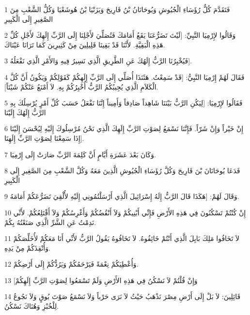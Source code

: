 \par 1 فَتَقَدَّمَ كُلُّ رُؤَسَاءِ الْجُيُوشِ وَيُوحَانَانُ بْنُ قَارِيحَ وَيَزَنْيَا بْنُ هُوشَعْيَا وَكُلُّ الشَّعْبِ مِنَ الصَّغِيرِ إِلَى الْكَبِيرِ
\par 2 وَقَالُوا لإِرْمِيَا النَّبِيِّ: [لَيْتَ تَضَرُّعَنَا يَقَعُ أَمَامَكَ فَتُصَلِّيَ لأَجْلِنَا إِلَى الرَّبِّ إِلَهِكَ لأَجْلِ كُلِّ هَذِهِ الْبَقِيَّةِ. لأَنَّنَا قَدْ بَقِينَا قَلِيلِينَ مِنْ كَثِيرِينَ كَمَا تَرَانَا عَيْنَاكَ.
\par 3 فَيُخْبِرُنَا الرَّبُّ إِلَهُكَ عَنِ الطَّرِيقِ الَّذِي نَسِيرُ فِيهِ وَالأَمْرِ الَّذِي نَفْعَلُهُ].
\par 4 فَقَالَ لَهُمْ إِرْمِيَا النَّبِيُّ: [قَدْ سَمِعْتُ. هَئَنَذَا أُصَلِّي إِلَى الرَّبِّ إِلَهِكُمْ كَقَوْلِكُمْ وَيَكُونُ أَنَّ كُلَّ الْكَلاَمِ الَّذِي يُجِيبُكُمُ الرَّبُّ أُخْبِرُكُمْ بِهِ. لاَ أَمْنَعُ عَنْكُمْ شَيْئاً].
\par 5 فَقَالُوا لإِرْمِيَا: [لِيَكُنِ الرَّبُّ بَيْنَنَا شَاهِداً صَادِقاً وَأَمِيناً إِنَّنَا نَفْعَلُ حَسَبَ كُلِّ أَمْرٍ يُرْسِلُكَ بِهِ الرَّبُّ إِلَهُكَ إِلَيْنَا
\par 6 إِنْ خَيْراً وَإِنْ شَرّاً. فَإِنَّنَا نَسْمَعُ لِصَوْتِ الرَّبِّ إِلَهِكَ الَّذِي نَحْنُ مُرْسِلُوكَ إِلَيْهِ لِيُحْسَنَ إِلَيْنَا إِذَا سَمِعْنَا لِصَوْتِ الرَّبِّ إِلَهِنَا].
\par 7 وَكَانَ بَعْدَ عَشَرَةِ أَيَّامٍ أَنَّ كَلِمَةَ الرَّبِّ صَارَتْ إِلَى إِرْمِيَا.
\par 8 فَدَعَا يُوحَانَانَ بْنَ قَارِيحَ وَكُلَّ رُؤَسَاءِ الْجُيُوشِ الَّذِينَ مَعَهُ وَكُلَّ الشَّعْبِ مِنَ الصَّغِيرِ إِلَى الْكَبِيرِ
\par 9 وَقَالَ لَهُمْ: [هَكَذَا قَالَ الرَّبُّ إِلَهُ إِسْرَائِيلَ الَّذِي أَرْسَلْتُمُونِي إِلَيْهِ لأُلْقِيَ تَضَرُّعَكُمْ أَمَامَهُ.
\par 10 إِنْ كُنْتُمْ تَسْكُنُونَ فِي هَذِهِ الأَرْضِ فَإِنِّي أَبْنِيكُمْ وَلاَ أَنْقُضُكُمْ وَأَغْرِسُكُمْ وَلاَ أَقْتَلِعُكُمْ. لأَنِّي نَدِمْتُ عَنِ الشَّرِّ الَّذِي صَنَعْتُهُ بِكُمْ.
\par 11 لاَ تَخَافُوا مَلِكَ بَابِلَ الَّذِي أَنْتُمْ خَائِفُوهُ. لاَ تَخَافُوهُ يَقُولُ الرَّبُّ لأَنِّي أَنَا مَعَكُمْ لأُخَلِّصَكُمْ وَأُنْقِذَكُمْ مِنْ يَدِهِ.
\par 12 وَأُعْطِيَكُمْ نِعْمَةً فَيَرْحَمُكُمْ وَيَرُدُّكُمْ إِلَى أَرْضِكُمْ.
\par 13 [وَإِنْ قُلْتُمْ لاَ نَسْكُنُ فِي هَذِهِ الأَرْضِ وَلَمْ تَسْمَعُوا لِصَوْتِ الرَّبِّ إِلَهِكُمْ
\par 14 قَائِلِينَ: لاَ بَلْ إِلَى أَرْضِ مِصْرَ نَذْهَبُ حَيْثُ لاَ نَرَى حَرْباً وَلاَ نَسْمَعُ صَوْتَ بُوقٍ وَلاَ نَجُوعُ لِلْخُبْزِ وَهُنَاكَ نَسْكُنُ.
